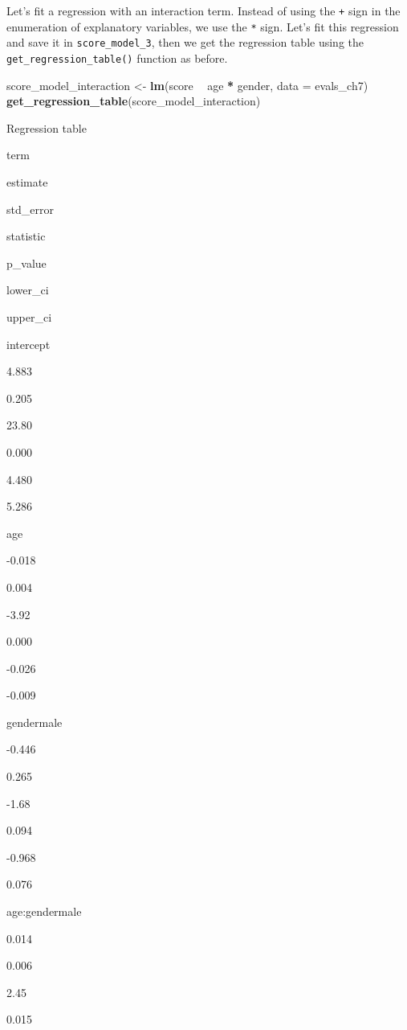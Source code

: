 \documentclass[12pt,]{krantz}
\makeatletter
\newenvironment{Shaded}{\begin{snugshade}}{\end{snugshade}}
\newcommand{\KeywordTok}[1]{\textcolor[rgb]{0.27,0.27,0.27}{\textbf{#1}}}
\newcommand{\DataTypeTok}[1]{\textcolor[rgb]{0.27,0.27,0.27}{#1}}
\newcommand{\StringTok}[1]{\textcolor[rgb]{0.5,0.5,0.5}{#1}}
\newcommand{\OperatorTok}[1]{\textcolor[rgb]{0.43,0.43,0.43}{\textbf{#1}}}
\newcommand{\NormalTok}[1]{#1}
\newenvironment{kframe}{%
\medskip{}
\setlength{\fboxsep}{.8em}
 \def\at@end@of@kframe{}%
 \ifinner\ifhmode%
  \def\at@end@of@kframe{\end{minipage}}%
  \begin{minipage}{\columnwidth}%
 \fi\fi%
 \def\FrameCommand##1{\hskip\@totalleftmargin \hskip-\fboxsep
 \colorbox{shadecolor}{##1}\hskip-\fboxsep
     \hskip-\linewidth \hskip-\@totalleftmargin \hskip\columnwidth}%
 \MakeFramed {\advance\hsize-\width
   \@totalleftmargin\z@ \linewidth\hsize
   \@setminipage}}%
 {\par\unskip\endMakeFramed%
 \at@end@of@kframe}
\renewenvironment{Shaded}{\begin{kframe}}{\end{kframe}}
\makeatother
\begin{document}
Let's fit a regression with an interaction term. Instead of using the
\texttt{+} sign in the enumeration of explanatory variables, we use the
\texttt{*} sign. Let's fit this regression and save it in
\texttt{score\_model\_3}, then we get the regression table using the
\texttt{get\_regression\_table()} function as before.

\begin{Shaded}
\begin{Highlighting}[]
\NormalTok{score_model_interaction <-}\StringTok{ }\KeywordTok{lm}\NormalTok{(score }\OperatorTok{~}\StringTok{ }\NormalTok{age }\OperatorTok{*}\StringTok{ }\NormalTok{gender, }\DataTypeTok{data =}\NormalTok{ evals_ch7)}
\KeywordTok{get_regression_table}\NormalTok{(score_model_interaction)}
\end{Highlighting}
\end{Shaded}

\label{tab:unnamed-chunk-253}Regression table

term

estimate

std\_error

statistic

p\_value

lower\_ci

upper\_ci

intercept

4.883

0.205

23.80

0.000

4.480

5.286

age

-0.018

0.004

-3.92

0.000

-0.026

-0.009

gendermale

-0.446

0.265

-1.68

0.094

-0.968

0.076

age:gendermale

0.014

0.006

2.45

0.015
\end{document}
